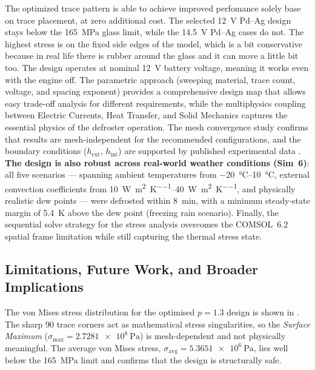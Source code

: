 The optimized trace pattern is able to achieve improved perfomance solely base on trace placement, at zero additional cost.
The selected \SI{12}{\volt} Pd--Ag design stays below the \SI{165}{\mega\pascal} glass limit, while the \SI{14.5}{\volt} Pd--Ag cases do not. The highest stress is on the fixed side edges of the model, which is a bit conservative because in real life there is rubber around the glass and it can move a little bit too. The design operates at nominal \SI{12}{\volt}
battery voltage, meaning it works even with the engine off. The parametric approach (sweeping material, trace
count, voltage, and spacing exponent) provides a comprehensive design map that allows easy trade-off analysis
for different requirements, while the multiphysics coupling between Electric Currents, Heat Transfer, and Solid
Mechanics captures the essential physics of the defroster operation. The mesh convergence study confirms that
results are mesh-independent for the recommended configurations, and the boundary conditions ($h_\text{ext}$,
$h_\text{int}$) are supported by published experimental data \cite{hozejowska2019}. \textbf{The design is also
robust across real-world weather conditions (Sim~6)}: all five scenarios --- spanning ambient temperatures from
\SIrange{-20}{10}{\celsius}, external convection coefficients from \SIrange{10}{40}{\watt\per\metre\squared\per\kelvin},
and physically realistic dew points --- were defrosted within \SI{8}{\minute}, with a minimum steady-state margin
of \SI{5.4}{\kelvin} above the dew point (freezing rain scenario). Finally, the sequential solve strategy for the
stress analysis overcomes the COMSOL~6.2 spatial frame limitation while still capturing the thermal stress state.

\subsection{Limitations, Future Work, and Broader Implications}

The von Mises stress distribution for the optimised $p = 1.3$ design is shown in .
The sharp 90\textdegree{} trace corners act as mathematical stress singularities, so the \emph{Surface Maximum}
($\sigma_\text{max} = \SI{2.7281e8}{\pascal}$) is mesh-dependent and not physically meaningful. The average
von Mises stress, $\sigma_\text{avg} = \SI{5.3651e6}{\pascal}$, lies well below the \SI{165}{\mega\pascal} limit
and confirms that the design is structurally safe.




